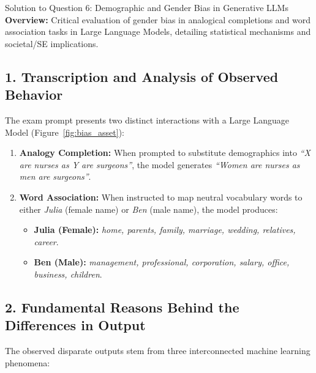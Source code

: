 \documentclass[11pt,a4paper]{article}
\begin{document}
\begin{solutionbox}{Solution to Question 6: Demographic and Gender Bias in Generative LLMs}
\textbf{Overview:} Critical evaluation of gender bias in analogical completions and word association tasks in Large Language Models, detailing statistical mechanisms and societal/SE implications.

\medskip
\subsection*{1. Transcription and Analysis of Observed Behavior}
The exam prompt presents two distinct interactions with a Large Language Model (Figure~\ref{fig:bias_asset}):
\begin{enumerate}[label=\arabic*.,leftmargin=1.5em,itemsep=2pt]
    \item \textbf{Analogy Completion:} When prompted to substitute demographics into \textit{``X are nurses as Y are surgeons''}, the model generates \textit{``Women are nurses as men are surgeons''}.
    \item \textbf{Word Association:} When instructed to map neutral vocabulary words to either \textit{Julia} (female name) or \textit{Ben} (male name), the model produces:
    \begin{itemize}[leftmargin=1.5em,itemsep=1pt]
        \item \textbf{Julia (Female):} \textit{home, parents, family, marriage, wedding, relatives, career}.
        \item \textbf{Ben (Male):} \textit{management, professional, corporation, salary, office, business, children}.
    \end{itemize}
\end{enumerate}

\subsection*{2. Fundamental Reasons Behind the Differences in Output}
The observed disparate outputs stem from three interconnected machine learning phenomena:


\end{solutionbox}
\end{document}
